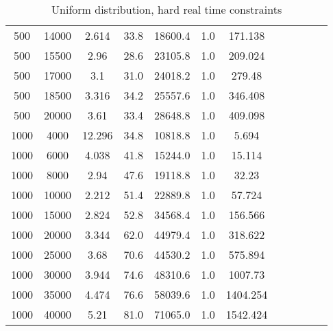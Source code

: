 \begin{table}[htb]
\begin{tabular}{|c|c|c|c|c|c|c|c|c|c|c|c|}
		500 & 14000 & 2.614 & 33.8 & 18600.4 & 1.0 & 171.138 & & & & &  \\ 
		500 & 15500 & 2.96 & 28.6 & 23105.8 & 1.0 & 209.024 & & & & &  \\ 
		500 & 17000 & 3.1 & 31.0 & 24018.2 & 1.0 & 279.48 & & & & &  \\ 
		500 & 18500 & 3.316 & 34.2 & 25557.6 & 1.0 & 346.408 & & & & &  \\ 
		500 & 20000 & 3.61 & 33.4 & 28648.8 & 1.0 & 409.098 & & & & &  \\ 
		1000 & 4000 & 12.296 & 34.8 & 10818.8 & 1.0 & 5.694 & & & & &  \\ 
		1000 & 6000 & 4.038 & 41.8 & 15244.0 & 1.0 & 15.114 & & & & &  \\ 
		1000 & 8000 & 2.94 & 47.6 & 19118.8 & 1.0 & 32.23 & & & & &  \\ 
		1000 & 10000 & 2.212 & 51.4 & 22889.8 & 1.0 & 57.724 & & & & &  \\ 
		1000 & 15000 & 2.824 & 52.8 & 34568.4 & 1.0 & 156.566 & & & & &  \\ 
		1000 & 20000 & 3.344 & 62.0 & 44979.4 & 1.0 & 318.622 & & & & &  \\ 
		1000 & 25000 & 3.68 & 70.6 & 44530.2 & 1.0 & 575.894 & & & & &  \\ 
		1000 & 30000 & 3.944 & 74.6 & 48310.6 & 1.0 & 1007.73 & & & & &  \\ 
		1000 & 35000 & 4.474 & 76.6 & 58039.6 & 1.0 & 1404.254 & & & & &  \\ 
		1000 & 40000 & 5.21 & 81.0 & 71065.0 & 1.0 & 1542.424 & & & & &  \\ 
		\hline 
	\end{tabular} 
	\caption{Uniform distribution, hard real time constraints} 
	\label{tab:unif_hard} 
\end{table} 

